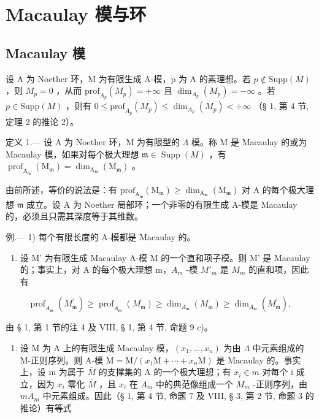 \section{Macaulay 模与环}

\subsection{Macaulay 模}

设 A 为 Noether 环，M 为有限生成 A-模，p 为 A 的素理想。若 \(p \notin \text{Supp}(M)\) ，则 \(M_{p} = 0\) ，从而 \(\text{prof}_{A_{p}}(M_{p}) = +\infty\) 且 \(\dim_{A_{p}}(M_{p}) = -\infty\) 。若 \(p \in \text{Supp}(M)\) ，则有 \(0 \leqslant \text{prof}_{A_{p}}(M_{p}) \leqslant \dim_{A_{p}}(M_{p}) < +\infty\) （§ 1, 第 4 节, 定理 2 的推论 2）。

定义 1.--- 设 A 为 Noether 环，M 为有限型的 \(\Lambda\) 模。称 M 是 Macaulay 的或为 Macaulay 模，如果对每个极大理想 \(\mathfrak{m} \in \operatorname{Supp}(M)\) ，有 \(\operatorname{prof}_{\mathrm{A}_{\mathfrak{m}}}\left(\mathrm{M}_{\mathfrak{m}}\right) = \dim_{\mathrm{A}_{\mathfrak{m}}}\left(\mathrm{M}_{\mathfrak{m}}\right)\) 。

由前所述，等价的说法是：有 \(\mathrm{prof}_{\mathrm{A}_{\mathfrak{m}}}\left(\mathrm{M}_{\mathfrak{m}}\right) \geqslant \dim_{\mathrm{A}_{\mathfrak{m}}}\left(\mathrm{M}_{\mathfrak{m}}\right)\) 对 A 的每个极大理想 \(\mathfrak{m}\) 成立。设 A 为 Noether 局部环；一个非零的有限生成 A-模是 Macaulay 的，必须且只需其深度等于其维数。

例.--- 1) 每个有限长度的 A-模都是 Macaulay 的。

\begin{enumerate}
\def\labelenumi{\arabic{enumi})}
\setcounter{enumi}{1}
\tightlist
\item
  设 M' 为有限生成 Macaulay A-模 M 的一个直和项子模。则 M' 是 Macaulay 的；事实上，对 A 的每个极大理想 m，\(A_{m}\) -模 \(M'_{m}\) 是 \(M_{m}\) 的直和项，因此有
\end{enumerate}

\[
\operatorname{prof} _ {A _ {\mathfrak {m}}} \left(M _ {\mathfrak {m}} ^ {\prime}\right) \geqslant \operatorname{prof} _ {A _ {\mathfrak {m}}} \left(M _ {\mathfrak {m}}\right) \geqslant \dim_ {A _ {\mathfrak {m}}} \left(M _ {\mathfrak {m}}\right) \geqslant \dim_ {A _ {\mathfrak {m}}} \left(M _ {\mathfrak {m}} ^ {\prime}\right),
\]

由 § 1, 第 1 节的注 4 及 VIII, § 1, 第 4 节, 命题 9 c)。

\begin{enumerate}
\def\labelenumi{\arabic{enumi})}
\setcounter{enumi}{2}
\tightlist
\item
  设 M 为 A 上的有限生成 Macaulay 模，\((x_{1},\ldots,x_{n})\) 为由 \(\Lambda\) 中元素组成的 M-正则序列。则 A-模 \(\overline{\mathrm{M}}=\mathrm{M}/(x_{1}\mathrm{M}+\cdots+x_{n}\mathrm{M})\) 是 Macaulay 的。事实上，设 m 为属于 \(\overline{M}\) 的支撑集的 A 的一个极大理想；有 \(x_{i}\in m\) 对每个 i 成立，因为 \(x_{i}\) 零化 \(\overline{M}\) ，且 \(x_{i}\) 在 \(A_{m}\) 中的典范像组成一个 \(M_{m}\) -正则序列，由 \(mA_{m}\) 中元素组成。因此（§ 1, 第 4 节, 命题 7 及 VIII, § 3, 第 2 节, 命题 3 的推论）有等式
\end{enumerate}

